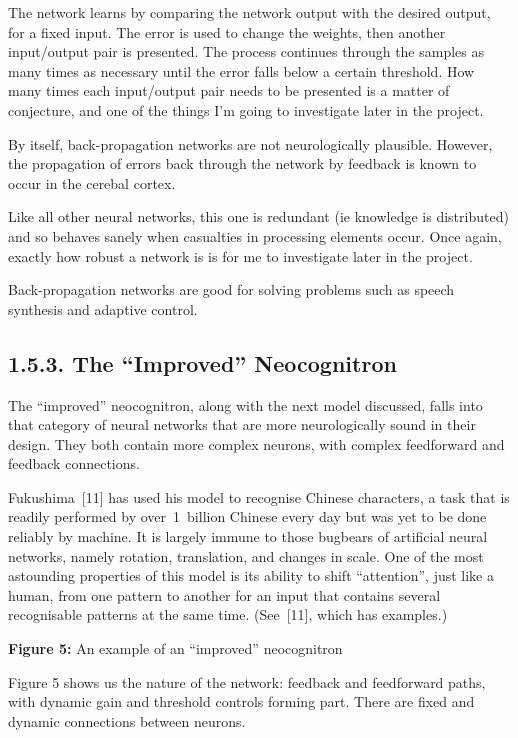 \documentclass[12pt]{report}
\begin{document}
The network learns by comparing the network output with the desired
output, for a fixed input.
The error is used to change the weights, then another input/output pair
is presented.
The process continues through the samples as many times as necessary
until the error falls below a certain threshold.
How many times each input/output pair needs to be presented is a matter
of conjecture, and one of the things I'm going to investigate later in
the project.

By itself, back-propagation networks are not neurologically plausible.
However, the propagation of errors back through the network by feedback
is known to occur in the cerebal cortex.

Like all other neural networks, this one is redundant (ie knowledge is distributed)
and so behaves sanely when
casualties in processing elements occur.
Once again, exactly how robust a network is is for me to investigate later
in the project.

Back-propagation networks are good for solving problems such as speech
synthesis and adaptive control.

\subsection{1.5.3. The ``Improved'' Neocognitron}

The ``improved'' neocognitron, along with the next model discussed, falls 
into that category of neural networks that are more neurologically sound in their
design.
They both contain more complex neurons, with complex feedforward and
feedback connections.

Fukushima~[11] has used his model to recognise Chinese characters, a
task that is readily performed by over~1~billion Chinese every day but
was yet to be done reliably by machine.
It is largely immune to those bugbears of artificial neural networks, namely
rotation, translation, and changes in scale.
One of the most astounding properties of this model is its ability to
shift ``attention'', just like a human, from one pattern to another for
an input that contains several recognisable patterns at the same time.
(See~[11], which has examples.)
\par\textbf{Figure 5:} An example of an ``improved'' neocognitron

Figure 5 shows us the nature of the network: feedback and feedforward
paths, with dynamic gain and threshold controls forming part.
There are fixed and dynamic connections between neurons.
\end{document}

